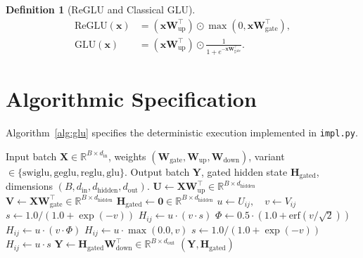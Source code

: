 \documentclass[11pt]{article}
\newtheorem{definition}{Definition}
\begin{document}
\begin{definition}[ReGLU and Classical GLU]
\begin{align}
\text{ReGLU}(\mathbf{x}) &= (\mathbf{x} \mathbf{W}_{\text{up}}^\top) \odot \max(0, \mathbf{x} \mathbf{W}_{\text{gate}}^\top), \\
\text{GLU}(\mathbf{x}) &= (\mathbf{x} \mathbf{W}_{\text{up}}^\top) \odot \frac{1}{1 + e^{-\mathbf{x} \mathbf{W}_{\text{gate}}^\top}}.
\end{align}
\end{definition}

\section{Algorithmic Specification}
\label{sec:algorithm}

Algorithm~\ref{alg:glu} specifies the deterministic execution implemented in \texttt{impl.py}.

\begin{algorithm}[H]
\caption{Deterministic Gated Linear Unit and Feedforward Evaluation}
\label{alg:glu}
\begin{algorithmic}[1]
\Require Input batch $\mathbf{X} \in \mathbb{R}^{B \times d_{\text{in}}}$, weights $(\mathbf{W}_{\text{gate}}, \mathbf{W}_{\text{up}}, \mathbf{W}_{\text{down}})$, variant $\in \{\text{swiglu}, \text{geglu}, \text{reglu}, \text{glu}\}$.
\Ensure Output batch $\mathbf{Y}$, gated hidden state $\mathbf{H}_{\text{gated}}$, dimensions $(B, d_{\text{in}}, d_{\text{hidden}}, d_{\text{out}})$.
\State $\mathbf{U} \gets \mathbf{X} \mathbf{W}_{\text{up}}^\top \in \mathbb{R}^{B \times d_{\text{hidden}}}$
\State $\mathbf{V} \gets \mathbf{X} \mathbf{W}_{\text{gate}}^\top \in \mathbb{R}^{B \times d_{\text{hidden}}}$
\State $\mathbf{H}_{\text{gated}} \gets \mathbf{0} \in \mathbb{R}^{B \times d_{\text{hidden}}}$
        \State $u \gets U_{ij}, \quad v \gets V_{ij}$
            \State $s \gets 1.0 / (1.0 + \exp(-v))$
            \State $H_{ij} \gets u \cdot (v \cdot s)$
            \State $\Phi \gets 0.5 \cdot (1.0 + \text{erf}(v / \sqrt{2}))$
            \State $H_{ij} \gets u \cdot (v \cdot \Phi)$
            \State $H_{ij} \gets u \cdot \max(0.0, v)$
            \State $s \gets 1.0 / (1.0 + \exp(-v))$
            \State $H_{ij} \gets u \cdot s$
        \EndIf
    \EndFor
\EndFor
\State $\mathbf{Y} \gets \mathbf{H}_{\text{gated}} \mathbf{W}_{\text{down}}^\top \in \mathbb{R}^{B \times d_{\text{out}}}$
\State \Return $(\mathbf{Y}, \mathbf{H}_{\text{gated}})$
\end{algorithmic}
\end{algorithm}
\end{document}
